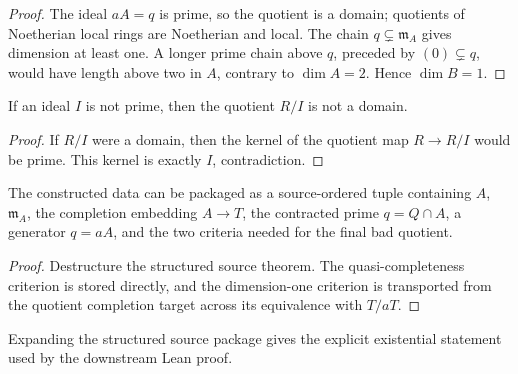 \begin{proof}
  The ideal \(aA=q\) is prime, so the quotient is a domain; quotients of
  Noetherian local rings are Noetherian and local.  The chain
  \(q\subsetneq\mathfrak m_A\) gives dimension at least one.  A longer prime
  chain above \(q\), preceded by \((0)\subsetneq q\), would have length above
  two in \(A\), contrary to \(\dim A=2\).  Hence \(\dim B=1\).
\end{proof}

\begin{lemma}
  \label{lem:quotient_not_domain_of_not_prime}
  If an ideal \(I\) is not prime, then the quotient \(R/I\) is not a domain.
\end{lemma}

\begin{proof}
  If \(R/I\) were a domain, then the kernel of the quotient map
  \(R\to R/I\) would be prime.  This kernel is exactly \(I\), contradiction.
\end{proof}

\begin{lemma}
  \label{lem:bad_quotient_structured_criteria_source}
  The constructed data can be packaged as a source-ordered tuple containing
  \(A\), \(\mathfrak m_A\), the completion embedding \(A\to T\), the contracted
  prime \(q=Q\cap A\), a generator \(q=aA\), and the two criteria needed for
  the final bad quotient.
\end{lemma}

\begin{proof}
  Destructure the structured source theorem.  The quasi-completeness criterion
  is stored directly, and the dimension-one criterion is transported from the
  quotient completion target across its equivalence with \(T/aT\).
\end{proof}

\begin{lemma}
  \label{lem:bad_quotient_criteria_source}
  Expanding the structured source package gives the explicit existential
  statement used by the downstream Lean proof.
\end{lemma}

